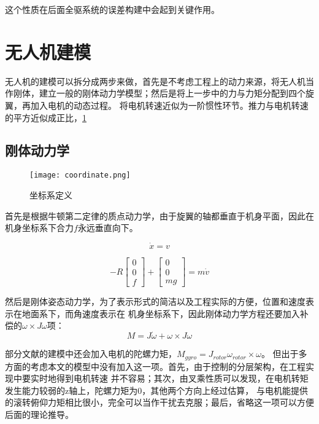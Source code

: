 这个性质在后面全驱系统的误差构建中会起到关键作用。
  \section{无人机建模}
  无人机的建模可以拆分成两步来做，首先是不考虑工程上的动力来源，将无人机当作刚体，建立一般的刚体动力学模型；然后是将上一步中的力与力矩分配到四个旋翼，再加入电机的动态过程。
  将电机转速近似为一阶惯性环节。推力与电机转速的平方近似成正比，\ref{fig:1}
    \subsection{刚体动力学}
    \begin{figure}[!h]
      \centering
      \texttt{[image: coordinate.png]}
      \caption{坐标系定义}
      \label{fig:1}
    \end{figure}
    首先是根据牛顿第二定律的质点动力学，由于旋翼的轴都垂直于机身平面，因此在机身坐标系下合力$f$永远垂直向下。

  \begin{equation}
    \dot x=v
  \end{equation}

  \begin{equation}
    -R \begin{bmatrix} 0\\ 0\\ f \end{bmatrix}+\begin{bmatrix} 0\\ 0\\ mg\end{bmatrix}=m \dot v 
  \end{equation}

    然后是刚体姿态动力学，为了表示形式的简洁以及工程实际的方便，位置和速度表示在地面系下，而角速度表示在
    机身坐标系下，因此刚体动力学方程还要加入补偿的$\omega \times J \omega$项：
  \begin{equation}
    M=J \dot\omega +\omega \times J \omega
    \label{equ:M}
  \end{equation}

    部分文献的建模中还会加入电机的陀螺力矩\cite{quanbook}，$M_{gyro}=J_{rotor} \omega_{rotor} \times \omega$。 
    但出于多方面的考虑本文的模型中没有加入这一项。首先，由于控制的分层架构，在工程实现中要实时地得到电机转速  并不容易；其次，由叉乘性质可以发现，在电机转矩发生能力较弱的z轴上，陀螺力矩为$0$，其他两个方向上经过估算，
    与电机能提供的滚转俯仰力矩相比很小，完全可以当作干扰去克服；最后，省略这一项可以方便后面的理论推导。

